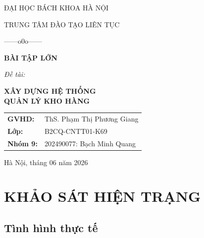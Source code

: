 \documentclass[12pt,a4paper]{report}
\begin{document}
\begin{titlepage}
\centering
{\large ĐẠI HỌC BÁCH KHOA HÀ NỘI\par}
{\large TRUNG TÂM ĐÀO TẠO LIÊN TỤC\par}
\vspace{0.3cm}
{\large ------o0o------\par}
\vspace{2.5cm}

{\Huge\bfseries BÀI TẬP LỚN\par}
\vspace{1.5cm}
{\large\itshape Đề tài:\par}
\vspace{0.4cm}
{\LARGE\bfseries\color{darkblue} XÂY DỰNG HỆ THỐNG\\[0.3cm] QUẢN LÝ KHO HÀNG\par}
\vspace{2.5cm}

\begin{flushleft}
\hspace{2.5cm}
\begin{tabular}{ll}
\textbf{GVHD:} & ThS. Phạm Thị Phương Giang \\[4pt]
\textbf{Lớp:} & B2CQ-CNTT01-K69 \\[4pt]
\textbf{Nhóm 9:} & 202490077: Bạch Minh Quang \\
\end{tabular}
\end{flushleft}

\vfill
{\large Hà Nội, tháng 06 năm 2026\par}
\end{titlepage}

\tableofcontents
\listoffigures
\listoftables
\clearpage

\chapter{KHẢO SÁT HIỆN TRẠNG}

\section{Tình hình thực tế}
\end{document}
